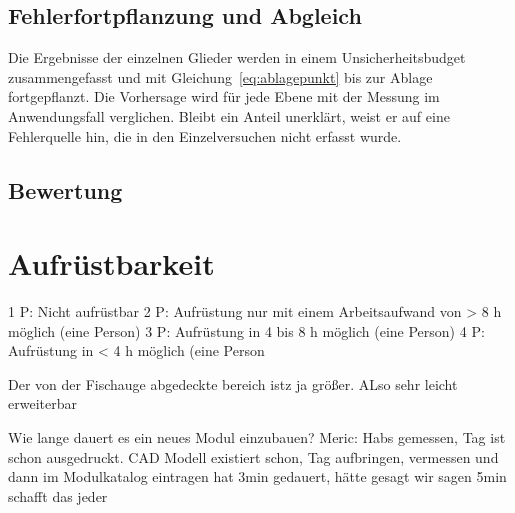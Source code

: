
\subsection{Fehlerfortpflanzung und Abgleich}
\label{subsec:Fehlerfortpflanzung}

Die Ergebnisse der einzelnen Glieder werden in einem Unsicherheitsbudget zusammengefasst und mit Gleichung~\eqref{eq:ablagepunkt} bis zur Ablage fortgepflanzt. Die Vorhersage wird für jede Ebene mit der Messung im Anwendungsfall verglichen. Bleibt ein Anteil unerklärt, weist er auf eine Fehlerquelle hin, die in den Einzelversuchen nicht erfasst wurde.


\subsection{Bewertung}
\label{subsec:Bewertung_Genauigkeit}



\section{Aufrüstbarkeit}
\label{sec:Aufrüstbarkeit_Verifikation}
1 P: Nicht aufrüstbar
2 P: Aufrüstung nur mit einem Arbeitsaufwand von > 8 h möglich (eine
Person)
3 P: Aufrüstung in 4 bis 8 h möglich (eine Person)
4 P: Aufrüstung in < 4 h möglich (eine Person

Der von der Fischauge abgedeckte bereich istz ja größer. ALso sehr leicht erweiterbar

Wie lange dauert es ein neues Modul einzubauen?
Meric: Habs gemessen, Tag ist schon ausgedruckt. CAD Modell existiert schon, Tag aufbringen, vermessen und dann im Modulkatalog eintragen hat 3min gedauert, hätte gesagt wir sagen 5min schafft das jeder





